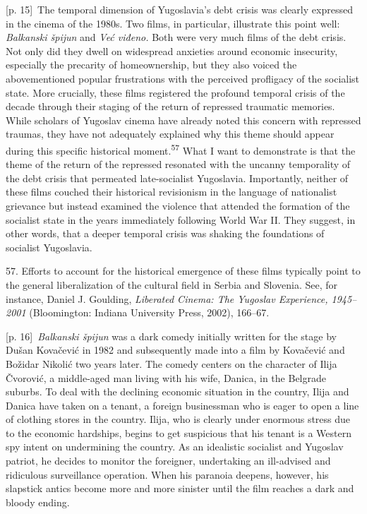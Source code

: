 \documentclass[10pt,a4paper]{article}
\begin{document}
{\scriptsize\color{gray} [p. 15]}\ The temporal dimension of Yugoslavia’s debt crisis was clearly expressed in the cinema of the 1980s. Two films, in particular, illustrate this point well: \textit{Balkanski špijun} and \textit{Već viđeno.} Both were very much films of the debt crisis. Not only did they dwell on widespread anxieties around economic insecurity, especially the precarity of homeownership, but they also voiced the abovementioned popular frustrations with the perceived profligacy of the socialist state. More crucially, these films registered the profound temporal crisis of the decade through their staging of the return of repressed traumatic memories. While scholars of Yugoslav cinema have already noted this concern with repressed traumas, they have not adequately explained why this theme should appear during this specific historical moment.\nobreak\textsuperscript{57} What I want to demonstrate is that the theme of the return of the repressed resonated with the uncanny temporality of the debt crisis that permeated late-socialist Yugoslavia. Importantly, neither of these films couched their historical revisionism in the language of nationalist grievance but instead examined the violence that attended the formation of the socialist state in the years immediately following World War II. They suggest, in other words, that a deeper temporal crisis was shaking the foundations of socialist Yugoslavia.\par{\small 57. Efforts to account for the historical emergence of these films typically point to the general liberalization of the cultural field in Serbia and Slovenia. See, for instance, Daniel J. Goulding, \textit{Liberated Cinema: The Yugoslav Experience, 1945–2001} (Bloomington: Indiana University Press, 2002), 166–67.\par}
{\scriptsize\color{gray} [p. 16]}\ \textit{Balkanski špijun} was a dark comedy initially written for the stage by Dušan Kovačević in 1982 and subsequently made into a film by Kovačević and Božidar Nikolić two years later. The comedy centers on the character of Ilija Čvorović, a middle-aged man living with his wife, Danica, in the Belgrade suburbs. To deal with the declining economic situation in the country, Ilija and Danica have taken on a tenant, a foreign businessman who is eager to open a line of clothing stores in the country. Ilija, who is clearly under enormous stress due to the economic hardships, begins to get suspicious that his tenant is a Western spy intent on undermining the country. As an idealistic socialist and Yugoslav patriot, he decides to monitor the foreigner, undertaking an ill-advised and ridiculous surveillance operation. When his paranoia deepens, however, his slapstick antics become more and more sinister until the film reaches a dark and bloody ending.\par
\end{document}
